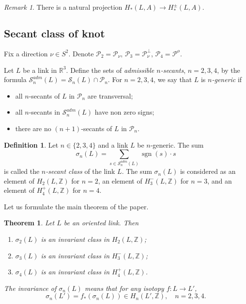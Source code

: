 \documentclass{article}
\newtheorem{theorem}{Theorem}
\theoremstyle{definition}
\newtheorem{definition}{Definition}
\theoremstyle{remark}
\newtheorem{remark}{Remark}
\def\Z{{\mathbb Z}}
\def\R{{\mathbb R}}
\DeclareMathOperator{\sgn}{\mathrm{sgn}}
\begin{document}
\begin{remark}
    There is a natural projection $H_*(L,A)\to H^\pm_*(L,A)$.
\end{remark}

\subsection{Secant class of knot}\label{subsect:secant_classes}

Fix a direction $\nu\in S^2$. Denote $\mathcal P_2=\mathcal P_\nu$, $\mathcal P_3=\mathcal P^\bot_\nu$, $\mathcal P_4=\mathcal P^o$.

Let $L$ be a link in $\R^3$. Define the sets of \emph{admissible $n$-secants}, $n=2,3,4$, by the formula $\mathcal S^{adm}_n(L)=\mathcal S_n(L)\cap\mathcal P_n$. For $n=2,3,4$, we say that $L$ is \emph{$n$-generic} if
\begin{itemize}
    \item all $n$-secants of $L$ in $\mathcal P_n$ are transversal;
    \item all $n$-secants in $\mathcal S^{adm}_n(L)$ have non zero signs;
    \item there are no $(n+1)$-secants of $L$ in $\mathcal P_n$.
\end{itemize}


\begin{definition}\label{def:n-secant_class}
    Let $n\in\{2,3,4\}$ and a link $L$ be $n$-generic. The sum
\[
\sigma_n(L)=\sum_{s\in \mathcal S^{adm}_n(L)}\sgn(s)\cdot s
\]
is called the \emph{$n$-secant class} of the link $L$. The sum $\sigma_n(L)$ is considered as an element of $H_2(L,\Z)$ for $n=2$, an element of $H_3^-(L,\Z)$ for $n=3$, and an element of $H_4^+(L,\Z)$ for $n=4$.
\end{definition}


Let us formulate the main theorem of the paper.

\begin{theorem}\label{thm:secant_class_invariance}
Let $L$ be an oriented link. Then
\begin{enumerate}
    \item $\sigma_2(L)$ is an invariant class in $H_2(L,\Z)$;
    \item $\sigma_3(L)$ is an invariant class in $H^-_3(L,\Z)$;
    \item $\sigma_4(L)$ is an invariant class in $H^+_4(L,\Z)$.
\end{enumerate}
The invariance of $\sigma_n(L)$ means that for any isotopy $f\colon L\to L'$,
\[
\sigma_n(L')=f_*(\sigma_n(L))\in H_n(L',\Z),\quad n=2,3,4.
\]
\end{theorem}
\end{document}
